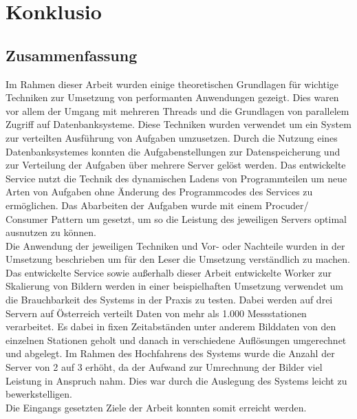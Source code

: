 \chapter{Konklusio}\label{chap:Konklusio}
\chapterstart

\section{Zusammenfassung}
Im Rahmen dieser Arbeit wurden einige theoretischen Grundlagen für wichtige Techniken zur Umsetzung von performanten Anwendungen gezeigt. Dies waren vor allem der Umgang mit mehreren Threads und die Grundlagen von parallelem Zugriff auf Datenbanksysteme. Diese Techniken wurden verwendet um ein System zur verteilten Ausführung von Aufgaben umzusetzen. Durch die Nutzung eines Datenbanksystemes konnten die Aufgabenstellungen zur Datenspeicherung und zur Verteilung der Aufgaben über mehrere Server gelöst werden. Das entwickelte Service nutzt die Technik des dynamischen Ladens von Programmteilen um neue Arten von Aufgaben ohne Änderung des Programmcodes des Services zu ermöglichen. Das Abarbeiten der Aufgaben wurde mit einem Procuder/ Consumer Pattern um gesetzt, um so die Leistung des jeweiligen Servers optimal ausnutzen zu können.
\\Die Anwendung der jeweiligen Techniken und Vor- oder Nachteile wurden in der Umsetzung beschrieben um für den Leser die Umsetzung verständlich zu machen.
\\Das entwickelte Service sowie außerhalb dieser Arbeit entwickelte Worker zur Skalierung von Bildern werden in einer beispielhaften Umsetzung verwendet um die Brauchbarkeit des Systems in der Praxis zu testen. Dabei werden auf drei Servern auf Österreich verteilt Daten von mehr als 1.000 Messstationen verarbeitet. Es dabei in fixen Zeitabständen unter anderem Bilddaten von den einzelnen Stationen geholt und danach in verschiedene Auflösungen umgerechnet und abgelegt. Im Rahmen des Hochfahrens des Systems wurde die Anzahl der Server von 2 auf 3 erhöht, da der Aufwand zur Umrechnung der Bilder viel Leistung in Anspruch nahm. Dies war durch die Auslegung des Systems leicht zu bewerkstelligen.
\\Die Eingangs gesetzten Ziele der Arbeit konnten somit erreicht werden.
\chapterend
